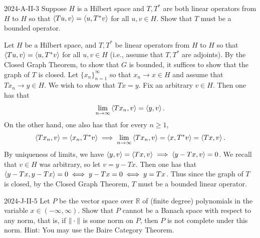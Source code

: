 \documentclass{article}
\begin{document}
	\begin{prb}{2024-A-II-3}
		Suppose $H$ is a Hilbert space and $T,T^\ast$ are both linear operators from $H$ to $H$ so that $\braket{Tu, v} = \braket{u, T^\ast v}$ for all $u, v \in H$. Show that $T$ must be a bounded operator. 
	\end{prb}
	Let $H$ be a Hilbert space, and $T, T^{\ast}$ be linear operators from $H$ to $H$ so that $\braket{Tu, v} = \braket{u, T^{\ast}v}$ for all $u, v \in H$ (i.e., assume that $T, T^{\ast}$ are adjoints). By the Closed Graph Theorem, to show that $G$ is bounded, it suffices to show that the graph of $T$ is closed. Let $\{x_{n}\}_{n = 1}^{\infty}$ so that $x_{n} \to x \in H$ and assume that $Tx_{n} \to y \in H$. We wish to show that $Tx = y$. Fix an arbitrary $v \in H$. Then one has that 
	\begin{equation*}
		\lim_{n \to \infty}\braket{Tx_{n}, v} = \braket{y, v}. 
	\end{equation*}
	On the other hand, one also has that for every $n \geq 1$, 
	\begin{equation*}
		\braket{Tx_{n}, v} = \braket{x_{n}, T^{\ast}v} \implies \lim_{n \to \infty}\braket{Tx_{n}, v} = \braket{x, T^{\ast}v} = \braket{Tx, v}. 
	\end{equation*} 
	By uniqueness of limits, we have $\braket{y, v} = \braket{Tx, v} \implies \braket{y - Tx, v} = 0$. We recall that $v \in H$ was arbitrary, so let $v = y - Tx$. Then one has that $\braket{y - Tx, y - Tx} =0 \iff y - Tx = 0 \iff y = Tx$. Thus since the graph of $T$ is closed, by the Closed Graph Theorem, $T$ must be a bounded linear operator. 
	
	
	\begin{prb}{2024-J-II-5}
		Let $P$ be the vector space over $\mathbb{R}$ of (finite degree) polynomials in the variable $x \in (-\infty, \infty)$. Show that $P$ cannot be a Banach space with respect to any norm, that is, if $\left\Vert \hspace{2pt}\cdot\hspace{2pt} \right\Vert$ is some norm on $P$, then $P$ is not complete under this norm. Hint: You may use the Baire Category Theorem. 
	\end{prb}
	
\end{document}
